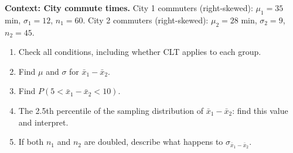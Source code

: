 \documentclass[10pt]{article}
\begin{document}
\vspace{0.12in}

\begin{tcolorbox}[colback=redbg, colframe=black!40, boxrule=0.6pt, arc=2mm,
    left=3mm, right=3mm, top=2mm, bottom=2mm, title=\textbf{Tier E --- Extension}]
\textbf{Context: City commute times.}
City 1 commuters (right-skewed): $\mu_1 = 35$ min, $\sigma_1 = 12$, $n_1 = 60$.
City 2 commuters (right-skewed): $\mu_2 = 28$ min, $\sigma_2 = 9$, $n_2 = 45$.

\begin{enumerate}
  \item Check all conditions, including whether CLT applies to each group.
  \item Find $\mu$ and $\sigma$ for $\bar{x}_1 - \bar{x}_2$.
        \vspace{0.5in}
  \item Find $P(5 < \bar{x}_1 - \bar{x}_2 < 10)$.
        \vspace{0.8in}
  \item The 2.5th percentile of the sampling distribution of $\bar{x}_1 - \bar{x}_2$:
        find this value and interpret.
        \vspace{0.8in}
  \item If both $n_1$ and $n_2$ are doubled, describe what happens to $\sigma_{\bar{x}_1-\bar{x}_2}$.
        \vspace{0.6in}
\end{enumerate}
\end{tcolorbox}
\end{document}
